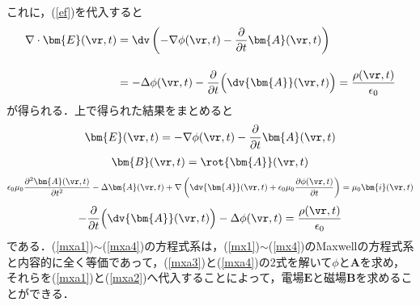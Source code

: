 これに，(\ref{ef})を代入すると
\begin{align}
   \nabla\cdot\bm{E}(\vr,t)&=\dv\left(-\nabla\phi(\vr,t)-\dfrac{\partial}{\partial t}{\bm{A}}(\vr,t)\right)\notag\\[10pt]
      &=-\Delta\phi(\vr,t)-\dfrac{\partial}{\partial t}\Bigl(\dv{\bm{A}}(\vr,t)\Bigr)=\frac{\rho(\vr,t)}{\epsilon_0}
\end{align}
が得られる．上で得られた結果をまとめると
\begin{align}
    \label{mxa1}
\bm{E}(\vr,t)=-\nabla\phi(\vr,t)-\dfrac{\partial}{\partial t}{\bm{A}}(\vr,t)
\end{align}
\begin{align}
  \label{mxa2}
\bm{B}(\vr,t)=\rot{\bm{A}}(\vr,t)
\end{align}
\begin{align}\label{mxa3}
\epsilon_0\mu_0\dfrac{\partial^2{\bm{A}}(\vr,t)}{\partial t^2}
-\Delta{\bm{A}}(\vr,t)+
\nabla
\left(\dv{\bm{A}}(\vr,t)+\epsilon_0\mu_0\dfrac{\partial\phi(\vr,t)}{\partial t}\right)
=\mu_0{\bm{i}}(\vr,t)
\end{align}
\begin{align}\label{mxa4}
-\dfrac{\partial}{\partial t}\Bigl(\dv{\bm{A}}(\vr,t)\Bigr)-\Delta\phi(\vr,t)=\frac{\rho(\vr,t)}{\epsilon_0}
\end{align}
である．(\ref{mxa1})$\sim$(\ref{mxa4})の方程式系は，(\ref{mx1})$\sim$(\ref{mx4})のMaxwellの方程式系と内容的に全く等価であって，(\ref{mxa3})と(\ref{mxa4})の2式を解いて$\phi$と${\bm{A}}$を求め，それらを(\ref{mxa1})と(\ref{mxa2})へ代入することによって，電場$\bm{E}$と磁場$\bm{B}$を求めることができる．\\



























%

